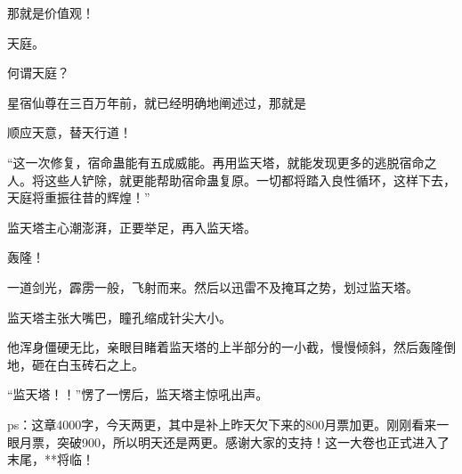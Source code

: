 \begin{this_body}
那就是价值观！

天庭。

何谓天庭？

星宿仙尊在三百万年前，就已经明确地阐述过，那就是

顺应天意，替天行道！

“这一次修复，宿命蛊能有五成威能。再用监天塔，就能发现更多的逃脱宿命之人。将这些人铲除，就更能帮助宿命蛊复原。一切都将踏入良性循环，这样下去，天庭将重振往昔的辉煌！”

监天塔主心潮澎湃，正要举足，再入监天塔。

轰隆！

一道剑光，霹雳一般，飞射而来。然后以迅雷不及掩耳之势，划过监天塔。

监天塔主张大嘴巴，瞳孔缩成针尖大小。

他浑身僵硬无比，亲眼目睹着监天塔的上半部分的一小截，慢慢倾斜，然后轰隆倒地，砸在白玉砖石之上。

“监天塔！！”愣了一愣后，监天塔主惊吼出声。

ps：这章4000字，今天两更，其中是补上昨天欠下来的800月票加更。刚刚看来一眼月票，突破900，所以明天还是两更。感谢大家的支持！这一大卷也正式进入了末尾，**将临！

\end{this_body}

